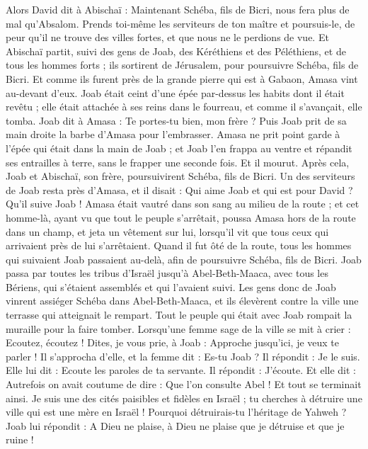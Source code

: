 \begin{multicols}{2}
Alors David dit à Abischaï : Maintenant Schéba, fils de Bicri, nous fera plus de mal qu’Absalom. Prends toi-même les serviteurs de ton maître et poursuis-le, de peur qu'il ne trouve des villes fortes, et que nous ne le perdions de vue.
Et Abischaï partit, suivi des gens de Joab, des Kéréthiens et des Péléthiens, et de tous les hommes forts ; ils sortirent de Jérusalem, pour poursuivre Schéba, fils de Bicri.
Et comme ils furent près de la grande pierre qui est à Gabaon, Amasa vint au-devant d'eux. Joab était ceint d'une épée par-dessus les habits dont il était revêtu ; elle était attachée à ses reins dans le fourreau, et comme il s’avançait, elle tomba.
Joab dit à Amasa : Te portes-tu bien, mon frère ? Puis Joab prit de sa main droite la barbe d’Amasa pour l'embrasser.
Amasa ne prit point garde à l'épée qui était dans la main de Joab ; et Joab l'en frappa au ventre et répandit ses entrailles à terre, sans le frapper une seconde fois. Et il mourut. Après cela, Joab et Abischaï, son frère, poursuivirent Schéba, fils de Bicri.
Un des serviteurs de Joab resta près d'Amasa, et il disait : Qui aime Joab et qui est pour David ? Qu'il suive Joab !
Amasa était vautré dans son sang au milieu de la route ; et cet homme-là, ayant vu que tout le peuple s'arrêtait, poussa Amasa hors de la route dans un champ, et jeta un vêtement sur lui, lorsqu’il vit que tous ceux qui arrivaient près de lui s'arrêtaient.
Quand il fut ôté de la route, tous les hommes qui suivaient Joab passaient au-delà, afin de poursuivre Schéba, fils de Bicri.
Joab passa par toutes les tribus d'Israël jusqu'à Abel-Beth-Maaca, avec tous les Bériens, qui s’étaient assemblés et qui l’avaient suivi.
Les gens donc de Joab vinrent assiéger Schéba dans Abel-Beth-Maaca, et ils élevèrent contre la ville une terrasse qui atteignait le rempart. Tout le peuple qui était avec Joab rompait la muraille pour la faire tomber.
Lorsqu’une femme sage de la ville se mit à crier : Ecoutez, écoutez ! Dites, je vous prie, à Joab : Approche jusqu'ici, je veux te parler !
Il s’approcha d’elle, et la femme dit : Es-tu Joab ? Il répondit : Je le suis. Elle lui dit : Ecoute les paroles de ta servante. Il répondit : J'écoute.
Et elle dit : Autrefois on avait coutume de dire : Que l'on consulte Abel ! Et tout se terminait ainsi.
Je suis une des cités paisibles et fidèles en Israël ; tu cherches à détruire une ville qui est une mère en Israël ! Pourquoi détruirais-tu l'héritage de Yahweh ?
Joab lui répondit : A Dieu ne plaise, à Dieu ne plaise que je détruise et que je ruine !

\end{multicols}
